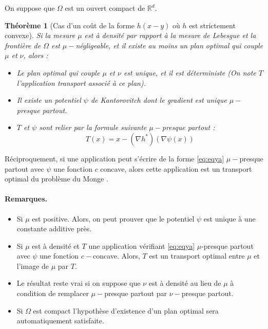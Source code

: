 \documentclass[
    8.2pt,
    a4paper,
    logo,
    twocolumn
]{template}
\newtheorem{theorem}{Théorème}
\begin{document}
    On suppose que $\Omega$ est un ouvert compact de $\mathbb{R}^d$.
    \begin{theorem}[Cas d'un coût de la forme $h(x-y)$ où $h$ est strictement convexe]\label{th:cout-s-convexe}
        Si la mesure $\mu$ est à densité par rapport à la mesure de Lebesgue et la frontière de $\Omega$ est $\mu-$négligeable, et il existe au moins un plan optimal qui couple $\mu$ et $\nu$, alors :
        \begin{itemize}
            \item Le plan optimal qui couple $\mu$ et $\nu$ est unique, et il est déterministe (On note $T$ l’application transport associé à ce plan).
            \item Il existe un potentiel $\psi$ de Kantorovitch dont le gradient est unique $\mu-$presque partout.
            \item $T$ et $\psi$ sont relier par la formule suivante $\mu-$presque partout :
            \begin{equation}\label{eq:eqya}
                T(x) = x - \left( \nabla{h^*} \right) \left( \nabla{\psi(x)} \right)
            \end{equation}
        \end{itemize}
    \end{theorem}
    Réciproquement, si une application peut s’écrire de la forme \ref{eq:eqya} $\mu-$presque partout avec $\psi$ une fonction $c$ concave, alors cette application est un transport optimal du problème du Monge \citep{santambrogio_optimal_2015, Notes}.
    \paragraph{Remarques. \citep{santambrogio_optimal_2015, Notes}}
    \hfill \break
    \begin{itemize}
        \item Si $\mu$ est positive. Alors, on peut prouver que le potentiel $\psi$ est unique à une constante additive près.
        \item Si $\mu$ est à densité et $T$ une application vérifiant \ref{eq:eqya} $\mu$-presque partout avec $\psi$ une fonction $c-$concave. Alors, $T$ est un transport optimal entre $\mu$ et l’image de $\mu$ par $T$.
        \item Le résultat reste vrai si on suppose que $\nu$ est à densité au lieu de $\mu$ à condition de remplacer $\mu-$presque partout par $\nu-$presque partout.
        \item Si $\Omega$ est compact l’hypothèse d’existence d’un plan optimal sera automatiquement satisfaite.
    \end{itemize}
\end{document}
